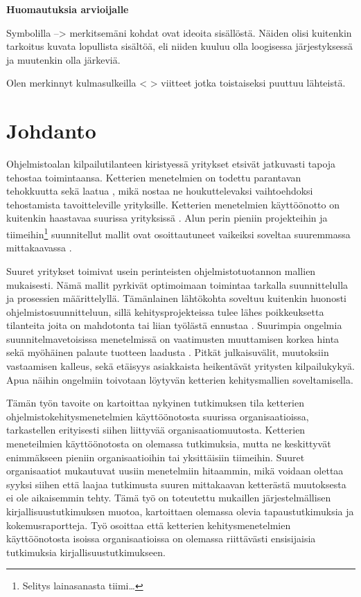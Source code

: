 
\textbf{Huomautuksia arvioijalle}

Symbolilla --> merkitsemäni kohdat ovat ideoita sisällöstä. Näiden olisi
kuitenkin tarkoitus kuvata lopullista sisältöä, eli niiden kuuluu olla
loogisessa järjestyksessä ja muutenkin olla järkeviä.

Olen merkinnyt kulmasulkeilla < > viitteet jotka toistaiseksi puuttuu lähteistä.

\newpage

\section{Johdanto}

Ohjelmistoalan kilpailutilanteen kiristyessä yritykset etsivät jatkuvasti tapoja
tehostaa toimintaansa. Ketterien menetelmien on todettu parantavan tehokkuutta
sekä laatua \citep{Livermore2008}, mikä nostaa ne houkuttelevaksi vaihtoehdoksi
tehostamista tavoitteleville yrityksille. Ketterien menetelmien käyttöönotto on
kuitenkin haastavaa suurissa yrityksissä \citep{Dyba2009}. Alun perin
pieniin projekteihin ja tiimeihin\footnote{Selitys lainasanasta tiimi\ldots}
suunnitellut mallit ovat osoittautuneet vaikeiksi soveltaa suuremmassa
mittakaavassa \citep{Boehm2005}.

Suuret yritykset toimivat usein perinteisten ohjelmistotuotannon mallien
mukaisesti. Nämä mallit pyrkivät optimoimaan toimintaa tarkalla suunnittelulla
ja prosessien määrittelyllä. Tämänlainen lähtökohta soveltuu kuitenkin huonosti
ohjelmistosuunnitteluun, sillä kehitysprojekteissa tulee lähes poikkeuksetta
tilanteita joita on mahdotonta tai liian työlästä ennustaa \citep{Schwaber2002}.
Suurimpia ongelmia suunnitelmavetoisissa menetelmissä on vaatimusten muuttamisen
korkea hinta sekä myöhäinen palaute tuotteen laadusta \citep{Petersen2010}.
Pitkät julkaisuvälit, muutoksiin vastaamisen kalleus, sekä etäisyys asiakkaista
heikentävät yritysten kilpailukykyä. Apua näihin ongelmiin toivotaan löytyvän
ketterien kehitysmallien soveltamisella.

Tämän työn tavoite on kartoittaa nykyinen tutkimuksen tila ketterien
ohjelmistokehitysmenetelmien käyttöönotosta suurissa organisaatioissa,
tarkastellen erityisesti siihen liittyvää organisaatiomuutosta. Ketterien
meneteilmien käyttöönotosta on olemassa tutkimuksia, mutta ne keskittyvät
enimmäkseen pieniin organisaatioihin tai yksittäisiin tiimeihin. Suuret
organisaatiot mukautuvat uusiin menetelmiin hitaammin, mikä voidaan olettaa
syyksi siihen että laajaa tutkimusta suuren mittakaavan ketterästä muutoksesta
ei ole aikaisemmin tehty. Tämä työ on toteutettu mukaillen järjestelmällisen
kirjallisuustutkimuksen muotoa, kartoittaen olemassa olevia tapaustutkimuksia ja
kokemusraportteja. Työ osoittaa että ketterien kehitysmenetelmien käyttöönotosta
isoissa organisaatioissa on olemassa riittävästi ensisijaisia tutkimuksia
kirjallisuustutkimukseen.

